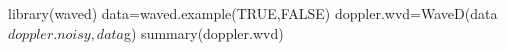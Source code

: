 \begin{SeeAlso}\relax
{}
\end{SeeAlso}
\begin{Examples}
\begin{ExampleCode}
library(waved)
data=waved.example(TRUE,FALSE)
doppler.wvd=WaveD(data$doppler.noisy,data$g)
summary(doppler.wvd)
\end{ExampleCode}
\end{Examples}

